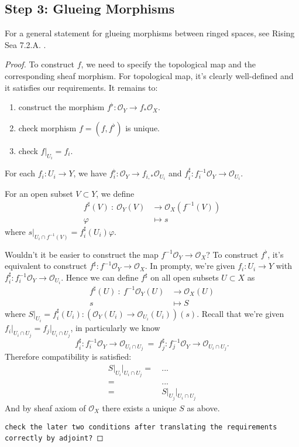 \subsection{Step 3: Glueing Morphisms}
For a general statement for glueing morphisms between ringed spaces, see Rising Sea 7.2.A. \cite{RaviRisingSea}.
\begin{proof}
    To construct $f$, we need to specify the topological map and the corresponding sheaf morphism. 
    For topological map, it's clearly well-defined and it satisfies our requirements. It remains to:
    \begin{enumerate}
        \item construct the morphism $f^{\flat}:\mathcal O_{Y}\to f_{\ast}\mathcal O_X$.
        \item check morphism $f=(f,f^{\flat})$ is unique.
        \item check $f\vert_{U_i}=f_i$.
    \end{enumerate}
    For each $f_i:U_i\to Y$, we have $f_i^{\flat}:\mathcal O_Y\to f_{i,\ast}\mathcal O_{U_i}$ and $f_i^{\sharp}:f_i^{-1}\mathcal O_Y\to\mathcal O_{U_i}$.

    
    For an open subset $V\subset Y$, we define 
    \begin{align*}
        f^{\sharp}(V) ~:~ \mathcal O_Y(V) &\to \mathcal O_X(f^{-1}(V))\\
                    \varphi &\mapsto s
    \end{align*}where $s\vert_{U_i\cap f^{-1}(V)}=f_i^{\sharp}(U_i)\varphi$.


    Wouldn't it be easier to construct the map $f^{-1}\mathcal O_Y\to \mathcal O_X$?
    To construct $f^{\flat}$, it's equivalent to construct $f^{\sharp}:f^{-1}\mathcal O_Y\to\mathcal O_X$. In prompty, we're given $f_i:U_i\to Y$ with $f_i^{\sharp}:f_i^{-1}\mathcal O_Y\to \mathcal O_{U_i}$. Hence we can define $f^{\sharp}$ on all open subsets $U\subset X$ as 
    \begin{align*}
        f^{\sharp}(U) ~:~ f^{-1}\mathcal O_Y(U) &\to\mathcal O_X (U)\\ 
                            s &\mapsto S
    \end{align*}where $S\vert_{U_i}=f_i^{\sharp}(U_i):(\mathcal O_Y(U_i)\to \mathcal O_{U_i}(U_i))(s)$. Recall that we're given $f_i\vert_{U_i\cap U_j}=f_j\vert_{U_i\cap U_j}$, in particularly we know
    \[f_i^{\sharp}:f_i^{-1}\mathcal O_Y\to \mathcal O_{U_i\cap U_j} ~=~ f_j^{\sharp}:f_j^{-1}\mathcal O_Y\to\mathcal O_{U_i\cap U_j}.\]
    Therefore compatibility is satisfied:
    \begin{align*}
        S\vert_{U_i}\vert_{U_i\cap U_j} =&~ ...\\
        =&~ ...\\
        =&~ S\vert_{U_j}\vert_{U_i\cap U_j}
    \end{align*}
    And by sheaf axiom of $\mathcal O_X$ there exists a unique $S$ as above. 

    \texttt{check the later two conditions after translating the requirements correctly by adjoint?}

\end{proof} 
